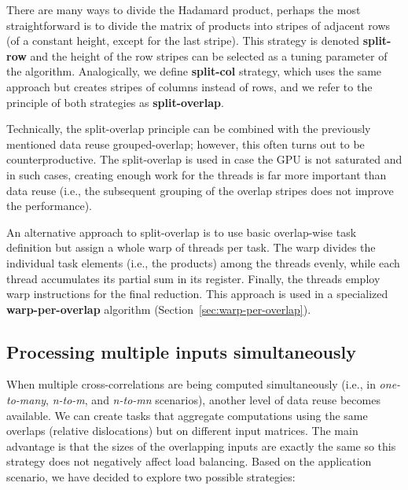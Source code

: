 There are many ways to divide the Hadamard product, perhaps the most straightforward is to divide the matrix of products into stripes of adjacent rows (of a constant height, except for the last stripe). This strategy is denoted \textbf{split-row} and the height of the row stripes can be selected as a tuning parameter of the algorithm. Analogically, we define \textbf{split-col} strategy, which uses the same approach but creates stripes of columns instead of rows, and we refer to the principle of both strategies as \textbf{split-overlap}.

Technically, the split-overlap principle can be combined with the previously mentioned data reuse grouped-overlap; however, this often turns out to be counterproductive. The split-overlap is used in case the GPU is not saturated and in such cases, creating enough work for the threads is far more important than data reuse (i.e., the subsequent grouping of the overlap stripes does not improve the performance).

An alternative approach to split-overlap is to use basic overlap-wise task definition but assign a whole warp of threads per task. The warp divides the individual task elements (i.e., the products) among the threads evenly, while each thread accumulates its partial sum in its register. Finally, the threads employ warp instructions for the final reduction. This approach is used in a specialized \textbf{warp-per-overlap} algorithm (Section~\ref{sec:warp-per-overlap}).


\subsection{Processing multiple inputs simultaneously}\label{sec:analysis-multimat}

When multiple cross-correlations are being computed simultaneously (i.e., in \textit{one-to-many}, \textit{n-to-m}, and \textit{n-to-mn} scenarios), another level of data reuse becomes available. We can create tasks that aggregate computations using the same overlaps (relative dislocations) but on different input matrices. The main advantage is that the sizes of the overlapping inputs are exactly the same so this strategy does not negatively affect load balancing. Based on the application scenario, we have decided to explore two possible strategies:

